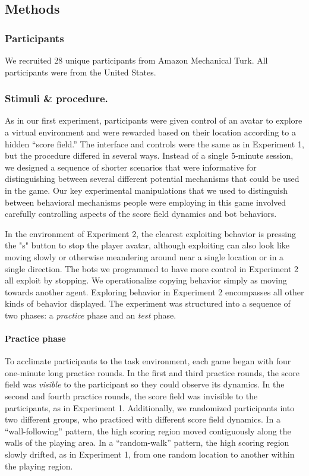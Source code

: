 \documentclass[12pt,letterpaper]{article}
\begin{document}
\subsection{Methods}
\subsubsection{Participants}

We recruited 28 unique participants from Amazon Mechanical Turk.
All participants were from the United States.

\subsubsection{Stimuli \& procedure.}

As in our first experiment, participants were given control of an avatar to explore a virtual environment and were rewarded based on their location according to a hidden ``score field.'' 
The interface and controls were the same as in Experiment 1, but the procedure differed in several ways. 
Instead of a single 5-minute session, we designed a sequence of shorter scenarios that were informative for distinguishing between several different potential mechanisms that could be used in the game. Our key experimental manipulations that we used to distinguish between behavioral mechanisms people were employing in this game involved carefully controlling aspects of the score field dynamics and bot behaviors. 

In the environment of Experiment 2, the clearest exploiting behavior is pressing the "s" button to stop the player avatar, although exploiting can also look like moving slowly or otherwise meandering around near a single location or in a single direction.  The bots we programmed to have more control in Experiment 2 all exploit by stopping.  We operationalize copying behavior simply as moving towards another agent.  Exploring behavior in Experiment 2 encompasses all other kinds of behavior displayed.
The experiment was structured into a sequence of two phases: a \emph{practice} phase and an \emph{test} phase.

\paragraph{Practice phase}

To acclimate participants to the task environment, each game began with four one-minute long practice rounds. 
In the first and third practice rounds, the score field was \emph{visible} to the participant so they could observe its dynamics.
In the second and fourth practice rounds, the score field was invisible to the participants, as in Experiment 1. 
Additionally, we randomized participants into two different groups, who practiced with different score field dynamics. 
In a ``wall-following'' pattern, the high scoring region moved contiguously along the walls of the playing area. 
In a ``random-walk'' pattern, the high scoring region slowly drifted, as in Experiment 1, from one random location to another within the playing region.
\end{document}
